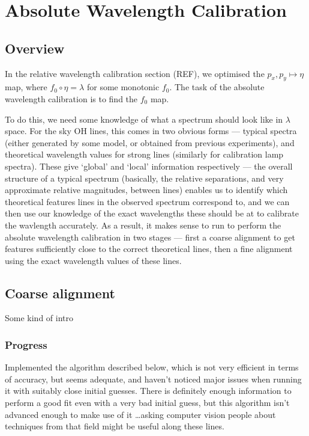 \section{Absolute Wavelength Calibration}

\subsection{Overview}

In the relative wavelength calibration section (REF), we optimised the
$p_x, p_y \mapsto \eta$ map, where $f_0 \circ \eta = \lambda$ for some
monotonic $f_0$. The task of the absolute wavelength calibration is to
find the $f_0$ map.

To do this, we need some knowledge of what a spectrum should look like
in $\lambda$ space. For the sky OH lines, this comes in two obvious
forms --- typical spectra (either generated by some model, or obtained
from previous experiments), and theoretical wavelength values for
strong lines (similarly for calibration lamp spectra). These give
`global' and `local' information respectively --- the overall structure
of a typical spectrum (basically, the relative separations, and very
approximate relative magnitudes, between lines) enables us to identify
which theoretical features lines in the observed spectrum correspond
to, and we can then use our knowledge of the exact wavelengths these
should be at to calibrate the wavlength accurately. As a result, it
makes sense to run to perform the absolute wavelength calibration in two
stages --- first a coarse alignment to get features sufficiently close
to the correct theoretical lines, then a fine alignment using the exact
wavelength values of these lines.


\subsection{Coarse alignment}

Some kind of intro

\subsubsection{Progress}

Implemented the algorithm described below, which is not very efficient in terms
of accuracy, but seems adequate, and haven't noticed major issues when running
it with suitably close initial guesses. There is definitely enough information
to perform a good fit even with a very bad initial guess, but this algorithm
isn't advanced enough to make use of it \dots asking computer vision people
about techniques from that field might be useful along these lines.

